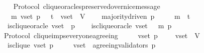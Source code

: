\begin{isabellebody}
%
\isadelimproof
\ \ %
\endisadelimproof
%
\isatagproof
{}\isamarkupfalse%
%
\endisatagproof
{\isafoldproof}%
%
\isadelimproof
\isanewline
%
\endisadelimproof
\isanewline
{}\isamarkupfalse%
\ {\isacharparenleft}\ Protocol{\isacharparenright}\ clique{\isacharunderscore}oracles{\isacharunderscore}preserved{\isacharunderscore}over{\isacharunderscore}nice{\isacharunderscore}message\ {\isacharcolon}\isanewline
\ \ {\isachardoublequoteopen}{\isasymforall}\ {\isasymsigma}\ m{\isacharprime}\ v{\isacharunderscore}set\ p{\isachardot}\ {\isasymsigma}\ {\isasymin}\ {\isasymSigma}t\ {\isasymand}\ v{\isacharunderscore}set\ {\isasymsubseteq}\ V\ \isanewline
\ \ {\isasymlongrightarrow}\ majority{\isacharunderscore}driven\ p\isanewline
\ \ {\isasymlongrightarrow}\ {\isasymsigma}\ {\isasymunion}\ {\isacharbraceleft}m{\isacharprime}{\isacharbraceright}\ {\isasymin}\ {\isasymSigma}t\isanewline
\ \ {\isasymlongrightarrow}\ is{\isacharunderscore}clique{\isacharunderscore}oracle\ {\isacharparenleft}v{\isacharunderscore}set{\isacharcomma}\ {\isasymsigma}{\isacharcomma}\ p{\isacharparenright}\ \isanewline
\ \ {\isasymlongrightarrow}\ is{\isacharunderscore}clique{\isacharunderscore}oracle\ {\isacharparenleft}v{\isacharunderscore}set{\isacharcomma}\ {\isasymsigma}\ {\isasymunion}\ {\isacharbraceleft}m{\isacharprime}{\isacharbraceright}{\isacharcomma}\ p{\isacharparenright}{\isachardoublequoteclose}\isanewline
%
\isadelimproof
\ \ %
\endisadelimproof
%
\isatagproof
{}\isamarkupfalse%
%
\endisatagproof
{\isafoldproof}%
%
\isadelimproof
\isanewline
%
\endisadelimproof
\isanewline
\isanewline
\isanewline
\isanewline
{}\isamarkupfalse%
\ {\isacharparenleft}\ Protocol{\isacharparenright}\ clique{\isacharunderscore}imps{\isacharunderscore}everyone{\isacharunderscore}agreeing\ {\isacharcolon}\isanewline
\ \ {\isachardoublequoteopen}{\isasymforall}\ {\isasymsigma}\ v{\isacharunderscore}set\ p{\isachardot}\ {\isasymsigma}\ {\isasymin}\ {\isasymSigma}\ {\isasymand}\ v{\isacharunderscore}set\ {\isasymsubseteq}\ V\ \isanewline
\ \ {\isasymlongrightarrow}\ is{\isacharunderscore}clique\ {\isacharparenleft}v{\isacharunderscore}set{\isacharcomma}\ p{\isacharcomma}\ {\isasymsigma}{\isacharparenright}\ \isanewline
\ \ {\isasymlongrightarrow}\ v{\isacharunderscore}set\ {\isasymsubseteq}\ agreeing{\isacharunderscore}validators\ {\isacharparenleft}p{\isacharcomma}\ {\isasymsigma}{\isacharparenright}{\isachardoublequoteclose}\isanewline
%
\isadelimproof
\ \ %
\endisadelimproof
%
\isatagproof
{}\isamarkupfalse%

\end{isabellebody}
